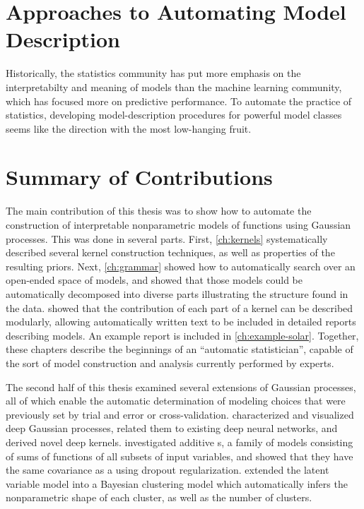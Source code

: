 \section{Approaches to Automating Model Description}


Historically, the statistics community has put more emphasis on the interpretabilty and meaning of models than the machine learning community, which has focused more on predictive performance.
To automate the practice of statistics, developing model-description procedures for powerful model classes seems like the direction with the most low-hanging fruit.



\section{Summary of Contributions}

The main contribution of this thesis was to show how to automate the construction of interpretable nonparametric models of functions using Gaussian processes.
This was done in several parts.
First, \cref{ch:kernels} systematically described several kernel construction techniques, as well as properties of the resulting \gp{} priors.
Next, \cref{ch:grammar} showed how to automatically search over an open-ended space of \gp{} models, and showed that those models could be automatically decomposed into diverse parts illustrating the structure found in the data.
 showed that the contribution of each part of a kernel can be described modularly, allowing automatically written text to be included in detailed reports describing \gp{} models.
An example report is included in \cref{ch:example-solar}.
Together, these chapters describe the beginnings of an ``automatic statistician'', capable of the sort of model construction and analysis currently performed by experts.

The second half of this thesis examined several extensions of Gaussian processes, all of which enable the automatic determination of modeling choices that were previously set by trial and error or cross-validation.
 characterized and visualized deep Gaussian processes, related them to existing deep neural networks, and derived novel deep kernels.
 investigated additive \gp{}s, a family of models consisting of sums of functions of all subsets of input variables, and showed that they have the same covariance as a \gp{} using dropout regularization.
 extended the \gp{} latent variable model into a Bayesian clustering model which automatically infers the nonparametric shape of each cluster, as well as the number of clusters.




